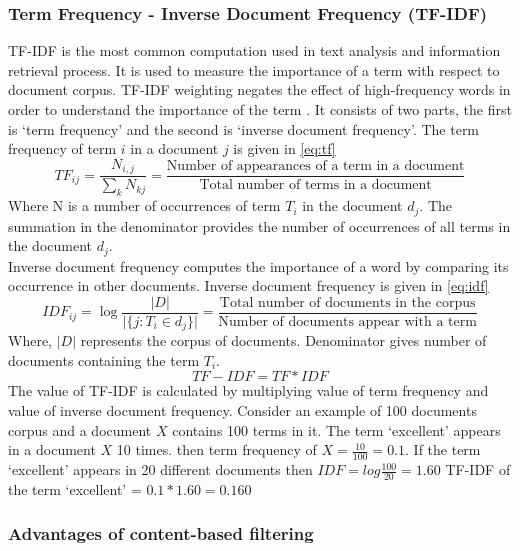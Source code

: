 \subsubsection{Term Frequency - Inverse Document Frequency (TF-IDF)}
\label{sec:tf-idf}
TF-IDF is the most common computation used in text analysis and information retrieval process. It is used to measure the importance of a term with respect to document corpus. TF-IDF weighting negates the effect of high-frequency words in order to understand the importance of the term \cite{47}. It consists of two parts, the first is `term frequency' and the second is `inverse document frequency'.  The term frequency of term $i$ in a document $j$ is given in \autoref{eq:tf}
\begin{equation}
TF_{ij} = \frac{N_{i,j}}{\sum_{k} N_{kj}} = \frac{\textrm{Number of appearances of a term in a document}}{\textrm{Total number of terms in a document}}
\label{eq:tf}
\end{equation}
\noindent Where N is a number of occurrences of term $T_{i}$ in the document $d_j$. The summation in the denominator provides the number of occurrences of all terms in the document $d_j$. 
\\
\noindent Inverse document frequency computes the importance of a word by comparing its occurrence in other documents. Inverse document frequency is given in \autoref{eq:idf} 
\begin{equation}
IDF_{ij} =\log  \frac{\vert D \vert}{\vert\{j:T_i \in d_j \}  \vert} = \frac{\textrm{Total number of documents in the corpus}}{\textrm{Number of documents appear with a term}}
\label{eq:idf}
\end{equation}
\noindent Where, $\vert D \vert$ represents the corpus of documents. Denominator gives number of documents containing the term $T_i$.
\\
\begin{equation}
TF-IDF = TF * IDF
\label{eq:tfidf}
\end{equation}
\noindent The value of TF-IDF is calculated by multiplying value of term frequency and value of inverse document frequency. Consider an example of 100 documents corpus and a document $X$ contains 100 terms in it. The term `excellent' appears in a document $X$ 10 times. then term frequency of $X = \frac{10}{100} = 0.1$. If the term `excellent' appears in 20 different documents then $IDF  = log\frac{100}{20} = 1.60 $ TF-IDF of the term `excellent' = $0.1 * 1.60 = 0.160 $


\subsubsection{Advantages of content-based filtering}

